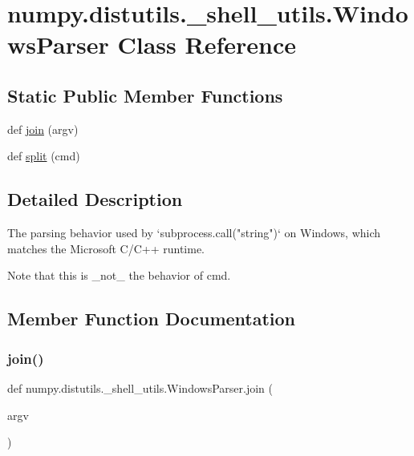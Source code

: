 \hypertarget{classnumpy_1_1distutils_1_1__shell__utils_1_1WindowsParser}{}\section{numpy.\+distutils.\+\_\+shell\+\_\+utils.\+Windows\+Parser Class Reference}
\label{classnumpy_1_1distutils_1_1__shell__utils_1_1WindowsParser}
\subsection*{Static Public Member Functions}
\begin{DoxyCompactItemize}
\item 
def \hyperlink{classnumpy_1_1distutils_1_1__shell__utils_1_1WindowsParser_adfb5efb69f9039cbc7c25cb21e2f58cd}{join} (argv)
\item 
def \hyperlink{classnumpy_1_1distutils_1_1__shell__utils_1_1WindowsParser_a1c754670bd88bd6d9615e828d89c8dba}{split} (cmd)
\end{DoxyCompactItemize}


\subsection{Detailed Description}
\begin{DoxyVerb}The parsing behavior used by `subprocess.call("string")` on Windows, which
matches the Microsoft C/C++ runtime.

Note that this is _not_ the behavior of cmd.
\end{DoxyVerb}
 

\subsection{Member Function Documentation}
\mbox{\label{classnumpy_1_1distutils_1_1__shell__utils_1_1WindowsParser_adfb5efb69f9039cbc7c25cb21e2f58cd}} 
\subsubsection{\texorpdfstring{join()}{join()}}
{\footnotesize\ttfamily def numpy.\+distutils.\+\_\+shell\+\_\+utils.\+Windows\+Parser.\+join (\begin{DoxyParamCaption}\item[{}]{argv }\end{DoxyParamCaption})\hspace{0.3cm}{\ttfamily [static]}}

